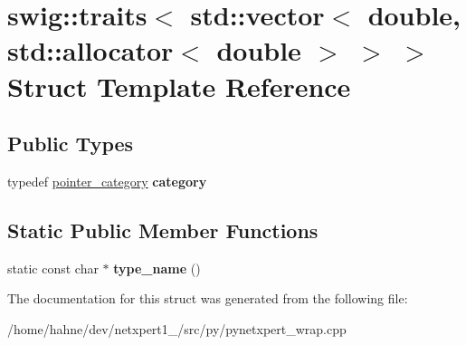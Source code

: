 \hypertarget{structswig_1_1traits_3_01std_1_1vector_3_01double_00_01std_1_1allocator_3_01double_01_4_01_4_01_4}{}\section{swig\+:\+:traits$<$ std\+:\+:vector$<$ double, std\+:\+:allocator$<$ double $>$ $>$ $>$ Struct Template Reference}
\label{structswig_1_1traits_3_01std_1_1vector_3_01double_00_01std_1_1allocator_3_01double_01_4_01_4_01_4}
\subsection*{Public Types}
\begin{DoxyCompactItemize}
\item 
typedef \hyperlink{structswig_1_1pointer__category}{pointer\+\_\+category} {\bfseries category}\hypertarget{structswig_1_1traits_3_01std_1_1vector_3_01double_00_01std_1_1allocator_3_01double_01_4_01_4_01_4_a70c608477567968995b8654448121595}{}\label{structswig_1_1traits_3_01std_1_1vector_3_01double_00_01std_1_1allocator_3_01double_01_4_01_4_01_4_a70c608477567968995b8654448121595}

\end{DoxyCompactItemize}
\subsection*{Static Public Member Functions}
\begin{DoxyCompactItemize}
\item 
static const char $\ast$ {\bfseries type\+\_\+name} ()\hypertarget{structswig_1_1traits_3_01std_1_1vector_3_01double_00_01std_1_1allocator_3_01double_01_4_01_4_01_4_aa34cfd8fe03073e6f32fc33cf48a5cf3}{}\label{structswig_1_1traits_3_01std_1_1vector_3_01double_00_01std_1_1allocator_3_01double_01_4_01_4_01_4_aa34cfd8fe03073e6f32fc33cf48a5cf3}

\end{DoxyCompactItemize}


The documentation for this struct was generated from the following file\+:\begin{DoxyCompactItemize}
\item 
/home/hahne/dev/netxpert1\+\_/src/py/pynetxpert\+\_\+wrap.\+cpp\end{DoxyCompactItemize}
